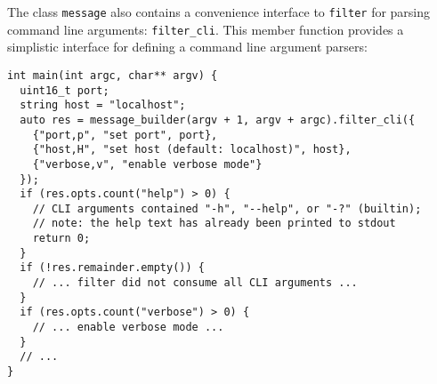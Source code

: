 The class \lstinline^message^ also contains a convenience interface to \lstinline^filter^ for parsing command line arguments: \lstinline^filter_cli^.
This member function provides a simplistic interface for defining a command line argument parsers:

\begin{lstlisting}
int main(int argc, char** argv) {
  uint16_t port;
  string host = "localhost";
  auto res = message_builder(argv + 1, argv + argc).filter_cli({
    {"port,p", "set port", port},
    {"host,H", "set host (default: localhost)", host},
    {"verbose,v", "enable verbose mode"}
  });
  if (res.opts.count("help") > 0) {
    // CLI arguments contained "-h", "--help", or "-?" (builtin);
    // note: the help text has already been printed to stdout
    return 0;
  }
  if (!res.remainder.empty()) {
    // ... filter did not consume all CLI arguments ...
  }
  if (res.opts.count("verbose") > 0) {
    // ... enable verbose mode ...
  }
  // ...
}
\end{lstlisting}

